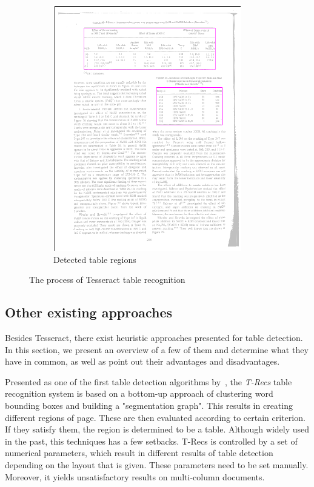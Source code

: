 \begin{figure}[t]
\begin{subfigure}{0.31\textwidth}
\includegraphics[width=\linewidth]{img/tableDetection/tableDetectionResult.pdf}
\caption{Detected table regions}
\label{fig:tessTableDet5}
\end{subfigure}
\caption{The process of Tesseract table recognition}
\label{fig:tesseractTableRecognition}
\end{figure}

\subsection{Other existing approaches}

Besides Tesseract, there exist heuristic approaches presented for table detection. In this section, we present an overview of a few of them and determine what they have in common, as well as point out their advantages and disadvantages.

Presented as one of the first table detection algorithms by~\citet{TRecs}, the \emph{T-Recs} table recognition system is based on a bottom-up approach of clustering word bounding boxes and building a "segmentation graph". This results in creating different regions of page. These are then evaluated according to certain criterion. If they satisfy them, the region is determined to be a table. Although widely used in the past, this techniques has a few setbacks. T-Recs is controlled by a set of numerical parameters, which result in different results of table detection depending on the layout that is given. These parameters need to be set manually. Moreover, it yields unsatisfactory results on multi-column documents.

